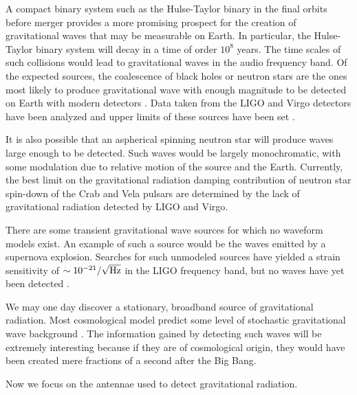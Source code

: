 A compact binary system such as the Hulse-Taylor binary in the final orbits before merger provides a more promising prospect for the creation of gravitational waves that may be measurable on Earth. %
In particular, the Hulse-Taylor binary system will decay in a time of order $10^8$ years. %
The time scales of such collisions would lead to gravitational waves in the audio frequency band. %
Of the expected sources, the coalescence of black holes or neutron stars are the ones most likely to produce gravitational wave with enough magnitude to be detected on Earth with modern detectors \cite{CBCrates}. %
Data taken from the LIGO and Virgo detectors have been analyzed and upper limits of these sources have been set \cite{CBC,CBCblackholes}.

It is also possible that an aspherical spinning neutron star will produce waves large enough to be detected. %
Such waves would be largely monochromatic, with some modulation due to relative motion of the source and the Earth. %
Currently, the best limit on the gravitational radiation damping contribution of neutron star spin-down of the Crab\cite{Crab} and Vela\cite{Vela} pulsars are determined by the lack of gravitational radiation detected by LIGO and Virgo.

There are some transient gravitational wave sources for which no waveform models exist. %
An example of such a source would be the waves emitted by a supernova explosion. %
Searches for such unmodeled sources have yielded a strain sensitivity of $\sim 10^{-21} / \sqrt{\rm{Hz}}$ in the LIGO frequency band, but no waves have yet been detected \cite{bursts}.

We may one day discover a stationary, broadband source of gravitational radiation. %
Most cosmological model predict some level of stochastic gravitational wave background \cite{bbn,stochdirectional}. %
The information gained by detecting such waves will be extremely interesting because if they are of cosmological origin, they would have been created mere fractions of a second after the Big Bang.

Now we focus on the antennae used to detect gravitational radiation.
